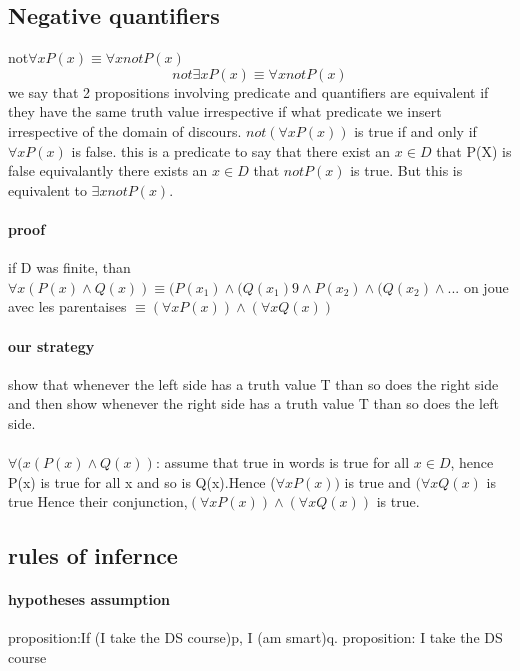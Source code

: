\documentclass[a4paper,10pt]{article}
\begin{document}
\subsection{Negative quantifiers}
not$\forall xP(x)\equiv \forall xnotP(x)$
\newline
\[not\exists xP(x)\equiv \forall xnotP(x)\]
we say that 2 propositions involving predicate and quantifiers are equivalent if they have the same truth value irrespective if what predicate we insert irrespective of the domain of discours.
\newline
$not(\forall xP(x))$ is true if and only if $ \forall xP(x)$ is false. this is a predicate to say that there exist an $x \in D$ that P(X) is false equivalantly there exists an $x\in D$ that $notP(x)$ is true. But this is equivalent to $\exists xnotP(x)$.
\paragraph{proof}
if D was finite, than $\forall x(P(x)\wedge Q(x))\equiv (P(x_1)\wedge(Q(x_1)9\wedge P(x_2)\wedge(Q(x_2)\wedge...$
\newline
on joue avec les parentaises
\newline
$\equiv (\forall xP(x))\wedge (\forall xQ(x))$
\paragraph{our strategy}
show that whenever the left side has a truth value T than so does the right side and then show whenever the right side has a truth value T than so does the left side.

\paragraph{}
$\forall (x(P(x)\wedge Q(x))$: assume that true in words is true for all $x\in D$, hence P(x) is true for all x and so is Q(x).Hence ($\forall xP(x))$ is true and $(\forall xQ(x)$ is true Hence their conjunction,$ (\forall xP(x))\wedge (\forall x Q(x))$ is true.

\subsection{rules of infernce}
\paragraph{hypotheses assumption}
proposition:If (I take the DS course)p, I (am smart)q.
\newline
proposition: I take the DS course
\end{document}
